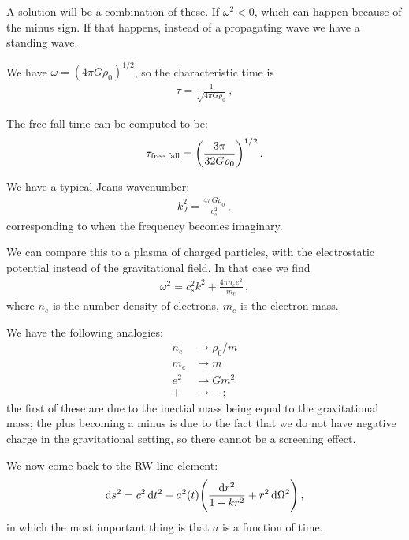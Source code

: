 \documentclass[main.tex]{subfiles}
\begin{document}
A solution will be a combination of these. If \(\omega^2<0\), which can happen because of the minus sign. If that happens, instead of a propagating wave we have a standing wave. 

We have \(\omega = (4 \pi G \rho_0  )^{1/2}\), so the characteristic time is 
%
\begin{align}
  \tau = \frac{1}{\sqrt{4 \pi G \rho_0 }}
\,,
\end{align}
%


The free fall time can be computed to be: 
%
\begin{align}
  \tau _{\text{free fall}} = \qty(\frac{3 \pi }{ 32 G \rho_0 })^{1/2}
\,.
\end{align}
%

We have a typical Jeans wavenumber: 
%
\begin{align}
  k_J^2 = \frac{4 \pi G \rho_0 }{c_s^2}
\,,
\end{align}
%
corresponding to when the frequency becomes imaginary. 

We can compare this to a plasma of charged particles, with the electrostatic potential instead of the gravitational field. 
In that case we find 
%
\begin{align}
  \omega^2 = c_s^2 k^2 + \frac{4 \pi n_e e^2}{m_e}
\,,
\end{align}
%
where \(n_e\) is the number density of electrons, \(m_e\) is the electron mass. 

We have the following analogies: 
%
\begin{subequations}
\begin{align}
  n_e &\rightarrow \rho_0 / m  \\
  m_e &\rightarrow m  \\
  e^2 &\rightarrow Gm^2  \\
  + &\rightarrow -
\,;
\end{align}
\end{subequations}
%
the first of these are due to the inertial mass being equal to the gravitational mass; the plus becoming a minus is due to the fact that we do not have negative charge in the gravitational setting, so there cannot be a screening effect. 

We now come back to the RW line element: 
%
\begin{align}
  \dd{s^2} = c^2 \dd{t^2} 
  -a^2(t) \qty(\frac{ \dd{r^2}}{1 - kr^2} + r^2 \dd{\Omega^2})
\,,
\end{align}
%
in which the most important thing is that \(a\) is a function of time. 
\end{document}
